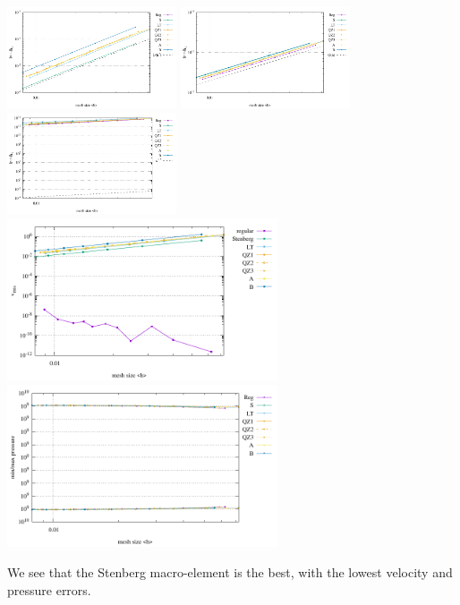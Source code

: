 \begin{center}
\includegraphics[width=5cm]{python_codes/fieldstone_78/results/aquarium/errors_V}
\includegraphics[width=5cm]{python_codes/fieldstone_78/results/aquarium/errors_P}
\includegraphics[width=5cm]{python_codes/fieldstone_78/results/aquarium/errors_Q}\\
\includegraphics[width=8cm]{python_codes/fieldstone_78/results/aquarium/vrms.pdf}
\includegraphics[width=8cm]{python_codes/fieldstone_78/results/aquarium/pstats.pdf}
\end{center}

We see that the Stenberg macro-element is the best, with the lowest velocity and pressure errors.


